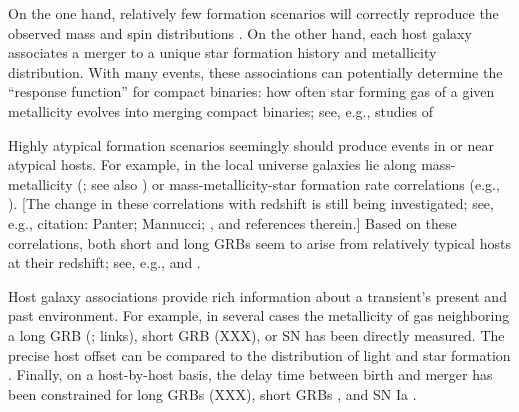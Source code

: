 \documentclass[nofootinbib,twocolumn,prd]{emulateapj}
\newcommand\editremark[1]{{\color{red}#1}}
\begin{document}

On the one hand,  relatively few formation scenarios will correctly reproduce the observed mass and spin distributions
\citep{2004MNRAS.352.1372B,2003ApJ...589L..37B,gwastro-Ilya-ConfProc-NRDA-2010}.  
On the other hand, each host galaxy associates a merger to a unique star formation history and metallicity distribution.
With many events, these associations can potentially determine the ``response function'' for compact binaries: how often star forming gas of a given metallicity evolves into
merging compact binaries;  see, e.g., studies of

%
Highly atypical formation scenarios seemingly should produce events in or near atypical hosts.  
For example, in the local universe galaxies lie along mass-metallicity  (\cite{2004ApJ...613..898T}; see also
\cite{sfr-ZEvolution-ByGalaxy-Panter2008})
or mass-metallicity-star formation rate  correlations (e.g., \cite{2010MNRAS.408.2115M}).
[The change in these correlations with redshift is still being investigated; see, e.g., \editremark{citation: Panter;
    Mannucci; }, \cite{2011ApJ...739....1L} and references therein.]
Based on these correlations, both short  and long GRBs seem to arise from
relatively typical hosts at their redshift; see, e.g., \cite{grb-short-Hosts-Berger2008} and \cite{grb-long-HostMetallicityVsTrend-Mannucci2010}.


Host galaxy associations provide rich information about a transient's present and past environment.
%
For example, in several cases the metallicity of gas neighboring a long GRB (\citet{ 2008AJ....135.1136M}; \citet{2010AJ....140.1557L}
\editremark{links}), short GRB (\editremark{XXX}), or SN has been directly measured.
%
The precise host offset can be compared to the distribution of light and star formation  \citep{2010ApJ...708....9F}.
%
Finally,  on a host-by-host basis, the delay time between birth and merger has been constrained for long GRBs (\editremark{XXX}), short GRBs \citep{2010ApJ...725.1202L}, and
  SN Ia \citep{2011MNRAS.412.1508M}.
%
\end{document}
